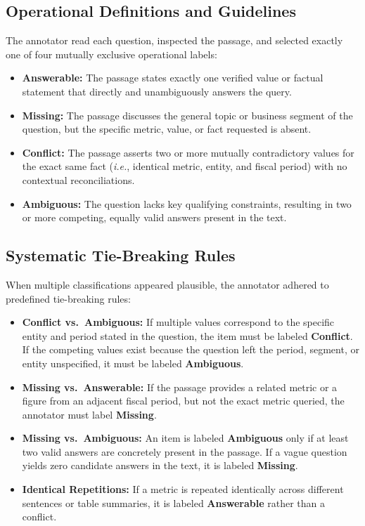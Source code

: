 \documentclass[11pt,letterpaper]{article}
\begin{document}
\subsection{Operational Definitions and Guidelines}
The annotator read each question, inspected the passage, and selected exactly one of four mutually exclusive operational labels:
\begin{itemize}
    \item \textbf{Answerable:} The passage states exactly one verified value or factual statement that directly and unambiguously answers the query.
    \item \textbf{Missing:} The passage discusses the general topic or business segment of the question, but the specific metric, value, or fact requested is absent.
    \item \textbf{Conflict:} The passage asserts two or more mutually contradictory values for the exact same fact (\textit{i.e.}, identical metric, entity, and fiscal period) with no contextual reconciliations.
    \item \textbf{Ambiguous:} The question lacks key qualifying constraints, resulting in two or more competing, equally valid answers present in the text.
\end{itemize}

\subsection{Systematic Tie-Breaking Rules}
When multiple classifications appeared plausible, the annotator adhered to predefined tie-breaking rules:
\begin{itemize}
    \item \textbf{Conflict vs.\ Ambiguous:} If multiple values correspond to the specific entity and period stated in the question, the item must be labeled \textbf{Conflict}. If the competing values exist because the question left the period, segment, or entity unspecified, it must be labeled \textbf{Ambiguous}.
    \item \textbf{Missing vs.\ Answerable:} If the passage provides a related metric or a figure from an adjacent fiscal period, but not the exact metric queried, the annotator must label \textbf{Missing}.
    \item \textbf{Missing vs.\ Ambiguous:} An item is labeled \textbf{Ambiguous} only if at least two valid answers are concretely present in the passage. If a vague question yields zero candidate answers in the text, it is labeled \textbf{Missing}.
    \item \textbf{Identical Repetitions:} If a metric is repeated identically across different sentences or table summaries, it is labeled \textbf{Answerable} rather than a conflict.
\end{itemize}
\end{document}
